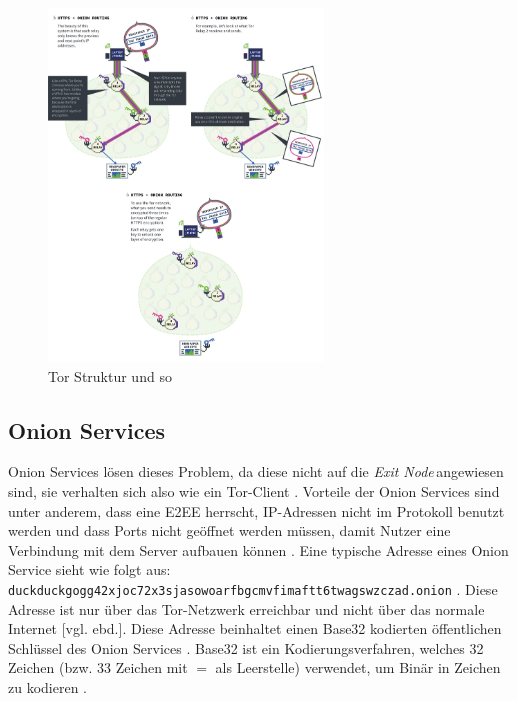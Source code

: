 \documentclass[a4paper,ngerman, headheight=28pt,12pt]{scrartcl}
\newcommand{\vcite}[1]{\cite[vgl.][]{#1}}
\newcommand{\vebd}{[vgl. ebd.]}
\newcommand{\exitn}{\textit{Exit Node\,}}
\begin{document}
\begin{figure}[h]
  \centering
  \includegraphics[width=0.65\textwidth]{tor_vertical.png}
  \caption{Tor Struktur und so \vcite{fig:Tor-Structure} \label{fig:TorStructure}}
\end{figure}
\subsection{Onion Services}
Onion Services lösen dieses Problem, da diese nicht auf die \exitn angewiesen sind, sie verhalten sich also wie ein Tor-Client \vcite{TorOnionServiceTalk}. Vorteile der Onion Services sind unter anderem, dass eine E2EE herrscht, IP-Adressen nicht im Protokoll benutzt werden und dass Ports nicht geöffnet werden müssen, damit Nutzer eine Verbindung mit dem Server aufbauen können \vcite{TorOnionService}. Eine typische Adresse eines Onion Service sieht wie folgt aus: \texttt{duckduckgogg42xjoc72x3sjasowoarfbgcmvfimaftt6twagswzczad.onion} \vcite{DuckDuckGoLink}. Diese Adresse ist nur über das Tor-Netzwerk erreichbar und nicht über das normale Internet \vebd. Diese Adresse beinhaltet einen Base32 kodierten öffentlichen Schlüssel des Onion Services \vcite{OnionAddrSpec}. Base32 ist ein Kodierungsverfahren, welches 32 Zeichen (bzw. 33 Zeichen mit $=$ als Leerstelle) verwendet, um Binär in Zeichen zu kodieren \vcite{Base32}.
\end{document}
